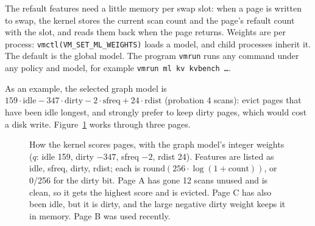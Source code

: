 \documentclass[10.5pt,a4paper]{article}
\newcommand{\code}[1]{\texttt{#1}}
\begin{document}
The refault features need a little memory per swap slot: when a page is
written to swap, the kernel stores the current scan count and the page's
refault count with the slot, and reads them back when the page returns.
Weights are per process: \code{vmctl(VM\_SET\_ML\_WEIGHTS)} loads a model, and
child processes inherit it. The default is the global model. The program
\code{vmrun} runs any command under any policy and model, for example
\code{vmrun ml kv kvbench \ldots}.

As an example, the selected graph model is
$159\cdot\text{idle} - 347\cdot\text{dirty} - 2\cdot\text{sfreq} + 24\cdot\text{rdist}$
(probation 4 scans): evict pages that have been idle longest, and strongly
prefer to keep dirty pages, which would cost a disk write. Figure~\ref{fig:scoring} works through three pages.

\begin{figure}[!htbp]
\centering
{}
\caption{How the kernel scores pages, with the graph model's integer weights
($q$: idle 159, dirty $-347$, sfreq $-2$, rdist 24). Features are listed as
idle, sfreq, dirty, rdist; each is $\mathrm{round}(256\cdot\log(1+\text{count}))$,
or 0/256 for the dirty bit. Page A has gone 12 scans unused and is clean, so it
gets the highest score and is evicted. Page C has also been idle, but it is
dirty, and the large negative dirty weight keeps it in memory. Page B was used
recently.}
\label{fig:scoring}
\end{figure}
\end{document}
